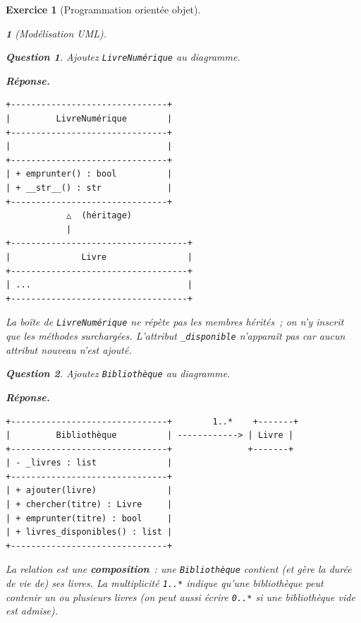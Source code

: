 \documentclass{article}
\theoremstyle{exostyle}
\newtheorem{exo}{Exercice}
\theoremstyle{partiestyle}
\newtheorem{partie}{}[exo]
\theoremstyle{questionstyle}
\newtheorem{questionpartie}{Question}[partie]
\newenvironment{reponse}{%
    \par\smallskip\noindent\textbf{Réponse.}\enspace\ignorespaces
}{%
    \par\smallskip
}
\begin{document}
\begin{exo}[Programmation orientée objet]
\begin{partie}[Modélisation UML]
        \begin{questionpartie}
            Ajoutez \texttt{LivreNumérique} au diagramme.
        \end{questionpartie}
        \begin{reponse}
\begin{verbatim}
+-------------------------------+
|         LivreNumérique        |
+-------------------------------+
|                               |
+-------------------------------+
| + emprunter() : bool          |
| + __str__() : str             |
+-------------------------------+
            △  (héritage)
            |
+-----------------------------------+
|              Livre                |
+-----------------------------------+
| ...                               |
+-----------------------------------+
\end{verbatim}
            La boîte de \texttt{LivreNumérique} ne répète pas les membres hérités~; on n'y inscrit que les méthodes surchargées. L'attribut \texttt{\_disponible} n'apparaît pas car aucun attribut nouveau n'est ajouté.
        \end{reponse}

        \begin{questionpartie}
            Ajoutez \texttt{Bibliothèque} au diagramme.
        \end{questionpartie}
        \begin{reponse}
\begin{verbatim}
+-------------------------------+        1..*    +-------+
|         Bibliothèque          | ------------> | Livre |
+-------------------------------+               +-------+
| - _livres : list              |
+-------------------------------+
| + ajouter(livre)              |
| + chercher(titre) : Livre     |
| + emprunter(titre) : bool     |
| + livres_disponibles() : list |
+-------------------------------+
\end{verbatim}
            La relation est une \textbf{composition}~: une \texttt{Bibliothèque} contient (et gère la durée de vie de) ses livres. La multiplicité \texttt{1..*} indique qu'une bibliothèque peut contenir un ou plusieurs livres (on peut aussi écrire \texttt{0..*} si une bibliothèque vide est admise).
        \end{reponse}

    \end{partie}
\end{exo}
\end{document}
